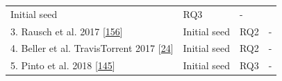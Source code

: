 \documentclass[]{book}
\begin{document}
\begin{longtable}[]{@{}llll@{}}
\begin{minipage}[t]{0.20\columnwidth}
Initial seed\strut
\end{minipage} & \begin{minipage}[t]{0.14\columnwidth}\raggedright\strut
RQ3\strut
\end{minipage} & \begin{minipage}[t]{0.06\columnwidth}\raggedright\strut
-\strut
\end{minipage}\tabularnewline
\begin{minipage}[t]{0.48\columnwidth}\raggedright\strut
3. Rausch et al. 2017
{[}\protect\hyperlink{ref-rausch2017empirical}{156}{]}\strut
\end{minipage} & \begin{minipage}[t]{0.20\columnwidth}\raggedright\strut
Initial seed\strut
\end{minipage} & \begin{minipage}[t]{0.14\columnwidth}\raggedright\strut
RQ2\strut
\end{minipage} & \begin{minipage}[t]{0.06\columnwidth}\raggedright\strut
-\strut
\end{minipage}\tabularnewline
\begin{minipage}[t]{0.48\columnwidth}\raggedright\strut
4. Beller et al. TravisTorrent 2017
{[}\protect\hyperlink{ref-beller2017travistorrent}{24}{]}\strut
\end{minipage} & \begin{minipage}[t]{0.20\columnwidth}\raggedright\strut
Initial seed\strut
\end{minipage} & \begin{minipage}[t]{0.14\columnwidth}\raggedright\strut
RQ2\strut
\end{minipage} & \begin{minipage}[t]{0.06\columnwidth}\raggedright\strut
-\strut
\end{minipage}\tabularnewline
\begin{minipage}[t]{0.48\columnwidth}\raggedright\strut
5. Pinto et al. 2018
{[}\protect\hyperlink{ref-pinto2018work}{145}{]}\strut
\end{minipage} & \begin{minipage}[t]{0.20\columnwidth}\raggedright\strut
Initial seed\strut
\end{minipage} & \begin{minipage}[t]{0.14\columnwidth}\raggedright\strut
RQ3\strut
\end{minipage} & \begin{minipage}[t]{0.06\columnwidth}\raggedright\strut
-\strut
\end{minipage}\tabularnewline

\end{longtable}
\end{document}
